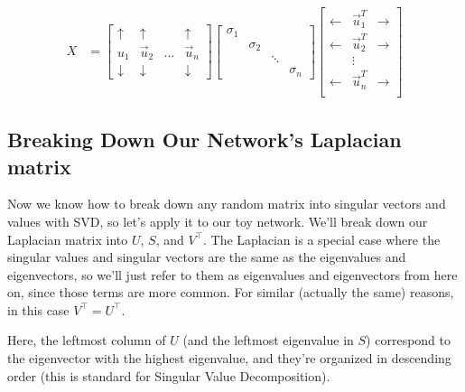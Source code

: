 \documentclass[letterpaper,10pt,english]{jupyterBook}
\begin{document}
\begin{align*}
    X &= \begin{bmatrix}
    \uparrow & \uparrow &  & \uparrow \\
    u_1 & \vec u_2 & ... & \vec u_n \\
    \downarrow & \downarrow &  & \downarrow
    \end{bmatrix}\begin{bmatrix}
    \sigma_1 & &  & \\
    & \sigma_2 &  & \\
    & & \ddots & \\
    & & & \sigma_n
    \end{bmatrix}\begin{bmatrix}
    \leftarrow & \vec u_1^T & \rightarrow \\
    \leftarrow & \vec u_2^T & \rightarrow \\
    & \vdots & \\
    \leftarrow & \vec u_n^T & \rightarrow \\
    \end{bmatrix}
\end{align*}

\subsection{Breaking Down Our Network’s Laplacian matrix}
\label{\detokenize{representations/ch6/spectral-embedding:breaking-down-our-network-s-laplacian-matrix}}
\sphinxAtStartPar
Now we know how to break down any random matrix into singular vectors and values with SVD, so let’s apply it to our toy network. We’ll break down our Laplacian matrix into \(U\), \(S\), and \(V^\top\). The Laplacian is a special case where the singular values and singular vectors are the same as the eigenvalues and eigenvectors, so we’ll just refer to them as eigenvalues and eigenvectors from here on, since those terms are more common. For similar (actually the same) reasons, in this case \(V^\top = U^\top\).

\sphinxAtStartPar
Here, the leftmost column of \(U\) (and the leftmost eigenvalue in \(S\)) correspond to the eigenvector with the highest eigenvalue, and they’re organized in descending order (this is standard for Singular Value Decomposition).

\begin{sphinxVerbatim}[commandchars=\\\{\}]
   
    
\end{sphinxVerbatim}
\end{document}
